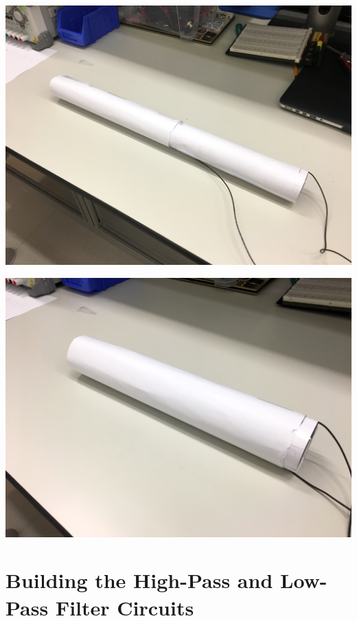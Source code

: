 \documentclass[journal]{IEEEtran}
\begin{document}
\begingroup
    \medskip
    \centering
    \includegraphics[width=\columnwidth]{images/lab4_3.jpg}
    \label{fig:mincap}
    \medskip
\endgroup

\begingroup
    \medskip
    \centering
    \includegraphics[width=\columnwidth]{images/lab4_4.jpg}
    \label{fig:maxcap}
    \medskip
\endgroup

\section{Building the High-Pass and Low-Pass Filter Circuits}
\end{document}
